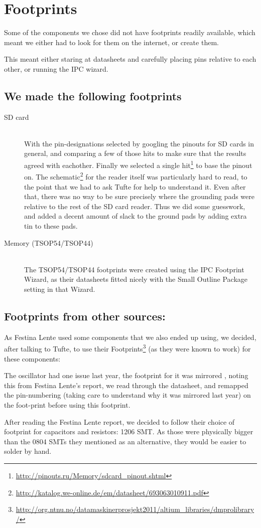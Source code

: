 \section {Footprints}
Some of the components we chose did not have footprints readily available, which
meant we either had to look for them on the internet, or create them.

This meant either staring at datasheets and carefully placing pins
relative to each other, or running the IPC wizard.

\subsection{We made the following footprints}

\begin{description}
\item[SD card] \hfill
\\
  With the pin-designations selected by googling the pinouts for
  \ac{SD} cards in general, and comparing a few of those hits to make sure that
  the results agreed with eachother. Finally we selected a single hit\footnote{\url{http://pinouts.ru/Memory/sdcard_pinout.shtml}}
  to base the pinout on. The
  schematic\footnote{\url{http://katalog.we-online.de/em/datasheet/693063010911.pdf}}
  for the reader itself was particularly hard to read, to the point that we had to ask Tufte
  for help to understand it. Even after that, there was no way to be sure
  precisely where the grounding pads were relative to the rest of the \ac{SD}
  card reader. Thus we did some guesswork, and added a decent amount
  of slack to the ground pads by adding extra tin to these pads.
\item[Memory (TSOP54/TSOP44)] \hfill
\\
  The TSOP54/TSOP44 footprints were created using
  the IPC Footprint Wizard, as their datasheets fitted nicely with the Small
  Outline Package setting in that Wizard.
\end{description}

\subsection{Footprints from other sources:}
As Festina Lente used some components that we also ended up using, we decided,
after talking to Tufte, to use their Footprints\footnote{\url{http://org.ntnu.no/datamaskinerprosjekt2011/altium_libraries/dmprolibrary/}}
(as they were known to work) for these components:


The oscillator had one issue last year, the footprint for it was mirrored
, noting this from Festina Lente's report, we read
through the datasheet, and remapped the pin-numbering (taking care to understand
why it was mirrored last year) on the foot-print 
before using this footprint.

After reading the Festina Lente report\cite{berg2011festinalente}, we decided to
follow their choice of footprint for capacitors and resistors: 1206 SMT. As
those were physically bigger than the 0804 SMTs they mentioned as an
alternative, they would be easier to solder by hand.
